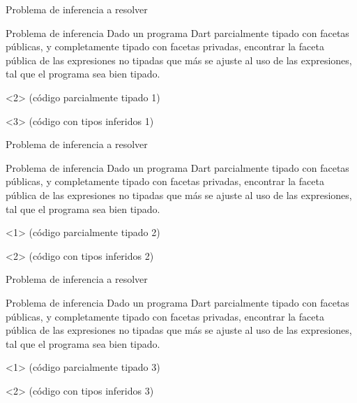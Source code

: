 \documentclass[aspectratio=169,10pt]{beamer}
\begin{document}
\begin{frame}[fragile]{Problema de inferencia a resolver}
	\begin{block}{Problema de inferencia}
		Dado un programa Dart parcialmente tipado con facetas públicas, y completamente tipado con facetas privadas, encontrar la faceta pública de las expresiones no tipadas que más se ajuste al uso de las expresiones, tal que el programa sea bien tipado.
	\end{block} \pause
	\begin{onlyenv}
		(código parcialmente tipado 1)
	\end{onlyenv}
	\begin{onlyenv}
		(código con tipos inferidos 1)
	\end{onlyenv}
\end{frame}
\begin{frame}[fragile]{Problema de inferencia a resolver}
	\begin{block}{Problema de inferencia}
		Dado un programa Dart parcialmente tipado con facetas públicas, y completamente tipado con facetas privadas, encontrar la faceta pública de las expresiones no tipadas que más se ajuste al uso de las expresiones, tal que el programa sea bien tipado.
	\end{block}
	\begin{onlyenv}
		(código parcialmente tipado 2)
	\end{onlyenv}
	\begin{onlyenv}
		(código con tipos inferidos 2)
	\end{onlyenv}
\end{frame}
\begin{frame}[fragile]{Problema de inferencia a resolver}
	\begin{block}{Problema de inferencia}
		Dado un programa Dart parcialmente tipado con facetas públicas, y completamente tipado con facetas privadas, encontrar la faceta pública de las expresiones no tipadas que más se ajuste al uso de las expresiones, tal que el programa sea bien tipado.
	\end{block}
	\begin{onlyenv}
		(código parcialmente tipado 3)
	\end{onlyenv}
	\begin{onlyenv}
		(código con tipos inferidos 3)
	\end{onlyenv}
\end{frame}
\end{document}
